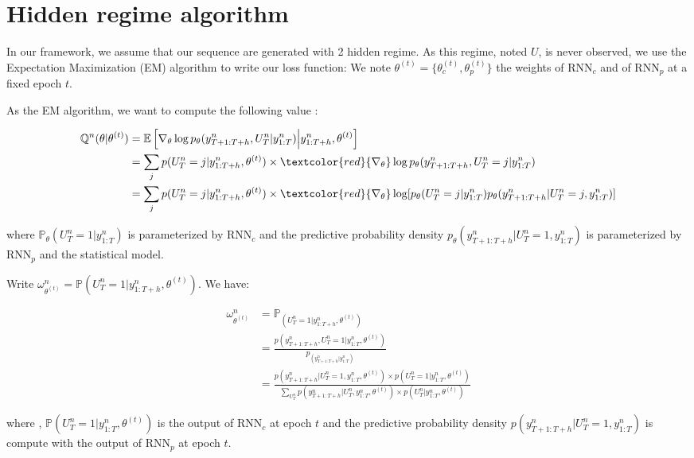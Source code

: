 \documentclass{article} %
\newcommand{\ts}{y}
\newcommand{\predictor}{\mathrm{RNN}_p}
\newcommand{\classifier}{\mathrm{RNN}_c}
\newcommand{\rnnparam}{\theta}
\newcommand{\hiddenregime}{U}
\begin{document}
\section{Hidden regime algorithm}

In our framework, we assume that our sequence are generated with 2 hidden regime. As this regime, noted $\hiddenregime$, is never observed, we use the Expectation Maximization (EM) algorithm to write our loss function:
We note $\rnnparam^{(t)} = \{\rnnparam_c^{(t)},\rnnparam_p^{(t)}\}$ the weights of $\classifier$ and of $\predictor$ at a fixed epoch $t$.

As the EM algorithm, we want to compute the following value :

\begin{align}
\mathbb{Q}^n(\rnnparam|\rnnparam^{(t)}) &= \mathbb{E}\left[\nabla_\theta \log p_\theta(\ts^n_{T+1:T+h},U_T^n|\ts^n_{1:T})\middle|\ts^n_{1:T+h},\rnnparam^{(t)}\right]\ \\
& = \sum_{j} p(U_T^n = j|\ts^n_{1:T+h},\rnnparam^{(t)}) \times \textcolor{red}{\nabla_\theta} \log p_\theta(\ts^n_{T+1:T+h},U_T^n = j|\ts^n_{1:T}) \\
& = \sum_{j} p(U_T^n = j|\ts^n_{1:T+h},\rnnparam^{(t)}) \times \textcolor{red}{\nabla_\theta}\log[p_\theta(U_T^n = j|\ts^n_{1:T})p_\theta(\ts^n_{T+1:T+h}|U_T^n = j,\ts^n_{1:T})]
\end{align}

where $ \mathbb{P}_{\theta}(U_T^n = 1|\ts^n_{1:T})$ is parameterized by $\classifier$ and the predictive probability density $p_{\theta}(\ts^n_{T+1:T+h}|U_T^n=1,\ts^n_{1:T})$ is parameterized by $\predictor$ and the statistical model.

Write $\omega_{\rnnparam^{(t)}}^n = \mathbb{P}(U_T^n = 1|\ts^n_{1:T+h},\rnnparam^{(t)})$. We have:

\begin{align*}
\omega_{\rnnparam^{(t)}}^n &= \mathbb{P}_(U_T^n = 1|\ts^n_{1:T+h},\rnnparam^{(t)}) \\
& =  \frac{p(\ts^n_{T+1:T+h},U_T^n = 1|\ts^n_{1:T},\rnnparam^{(t)})}{p_(\ts^n_{T+1:T+h}|\ts^n_{1:T})} \\
& =  \frac{p(\ts^n_{T+1:T+h}|U_T^n = 1,\ts^n_{1:T},\rnnparam^{(t)}) \times p(U_T^n = 1|\ts^n_{1:T},\rnnparam^{(t)})}{\sum_{U_T^n}p(\ts^n_{T+1:T+h}|U_T^n,\ts^n_{1:T},\rnnparam^{(t)}) \times p(U_T^n|\ts^n_{1:T},\rnnparam^{(t)})}
\end{align*}

where , $\mathbb{P}(U_T^n=1|\ts^n_{1:T},\rnnparam^{(t)})$ is the output of $\classifier$ at epoch $t$ and the predictive probability density $p(\ts^n_{T+1:T+h}|U_T^n=1,\ts^n_{1:T})$ is compute with the output of $\predictor$ at epoch $t$.
\end{document}
